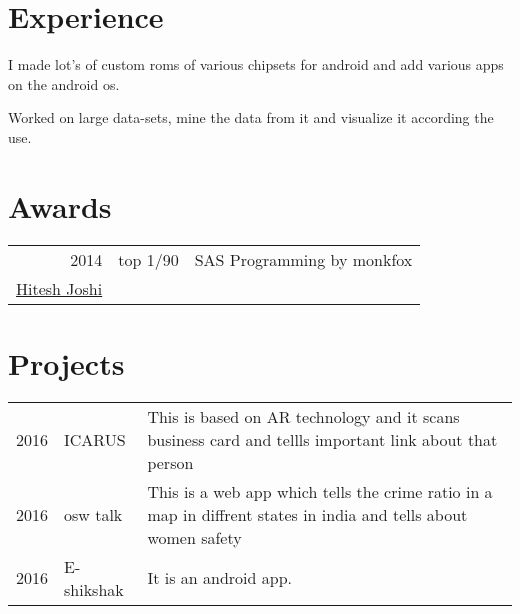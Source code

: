 \documentclass[]{deedy-resume-openfont}
\begin{document}
\begin{minipage}[t]{0.66\textwidth} 


\section{Experience}

\vspace{\topsep} %
\begin{tightemize}
\item I made lot's of custom roms of various chipsets for android and add various apps on the android os.
\end{tightemize}
\sectionsep

\begin{tightemize}
\item Worked on large data-sets, mine the data from it and visualize it according the use.
\end{tightemize}
\sectionsep




\section{Awards} 
\begin{tabular}{rll}
2014	     & top 1/90  & SAS Programming by monkfox\\
\href{https://drive.google.com/file/d/0BzJR9Ohka16MNHVVVmd5dWxRdGc/view}{Hitesh Joshi}
\end{tabular}
\sectionsep


\section{Projects} 

\begin{tabular}{rll}
2016 	& ICARUS & This is based on AR technology and it scans business card and tellls important link about that person\\
2016   & osw talk   & This is a web app which tells the crime ratio in a map in diffrent states in india and tells about women safety\\
2016   &  E-shikshak  & It is an android app.\\
\end{tabular}
\sectionsep



\end{minipage} 
\end{document}
